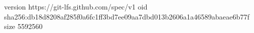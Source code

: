 version https://git-lfs.github.com/spec/v1
oid sha256:db18d8208af285f0a6fc1ff3bd7ee09aa7dbd013b2606a1a46589abaeae6b77f
size 5592560
